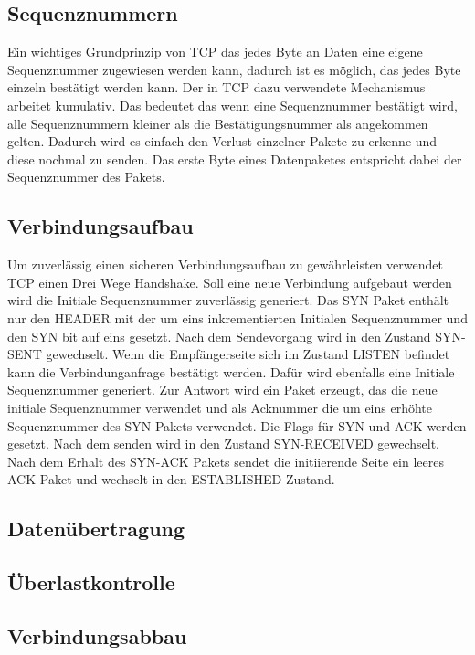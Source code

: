 \subsection{Sequenznummern}
Ein wichtiges Grundprinzip von TCP das jedes Byte an Daten eine eigene Sequenznummer zugewiesen werden kann, dadurch ist es möglich, das jedes Byte einzeln bestätigt werden kann. Der in TCP dazu verwendete Mechanismus arbeitet kumulativ. Das bedeutet das wenn eine Sequenznummer bestätigt wird, alle Sequenznummern kleiner als die Bestätigungsnummer als angekommen gelten. Dadurch wird es einfach den Verlust einzelner Pakete zu erkenne und diese nochmal zu senden. Das erste Byte eines Datenpaketes entspricht dabei der Sequenznummer des Pakets. 

\subsection{Verbindungsaufbau}
Um zuverlässig einen sicheren Verbindungsaufbau zu gewährleisten verwendet TCP einen Drei Wege Handshake. Soll eine neue Verbindung aufgebaut werden wird die Initiale Sequenznummer zuverlässig generiert. Das SYN Paket enthält nur den HEADER mit der um eins inkrementierten Initialen Sequenznummer und den SYN bit auf eins gesetzt. Nach dem Sendevorgang wird in den Zustand SYN-SENT gewechselt. Wenn die Empfängerseite sich im Zustand LISTEN befindet kann die Verbindunganfrage bestätigt werden. Dafür wird ebenfalls eine Initiale Sequenznummer generiert. Zur Antwort wird ein Paket erzeugt, das die neue initiale Sequenznummer verwendet und als Acknummer die um eins erhöhte Sequenznummer des SYN Pakets verwendet. Die Flags für SYN und ACK werden gesetzt. Nach dem senden wird in den Zustand SYN-RECEIVED gewechselt.\\
Nach dem Erhalt des SYN-ACK Pakets sendet die initiierende Seite ein leeres ACK Paket und wechselt in den ESTABLISHED Zustand. 
\subsection{Datenübertragung}

\subsection{Überlastkontrolle}

\subsection{Verbindungsabbau}

